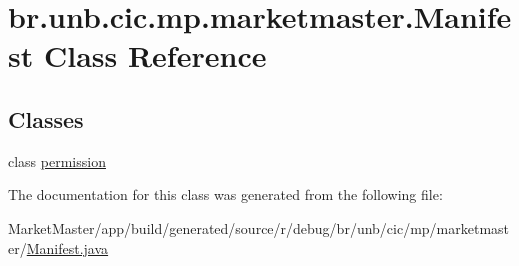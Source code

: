 \hypertarget{classbr_1_1unb_1_1cic_1_1mp_1_1marketmaster_1_1Manifest}{}\section{br.\+unb.\+cic.\+mp.\+marketmaster.\+Manifest Class Reference}
\label{classbr_1_1unb_1_1cic_1_1mp_1_1marketmaster_1_1Manifest}
\subsection*{Classes}
\begin{DoxyCompactItemize}
\item 
class \mbox{\hyperlink{classbr_1_1unb_1_1cic_1_1mp_1_1marketmaster_1_1Manifest_1_1permission}{permission}}
\end{DoxyCompactItemize}


The documentation for this class was generated from the following file\+:\begin{DoxyCompactItemize}
\item 
Market\+Master/app/build/generated/source/r/debug/br/unb/cic/mp/marketmaster/\mbox{\hyperlink{Manifest_8java}{Manifest.\+java}}\end{DoxyCompactItemize}
